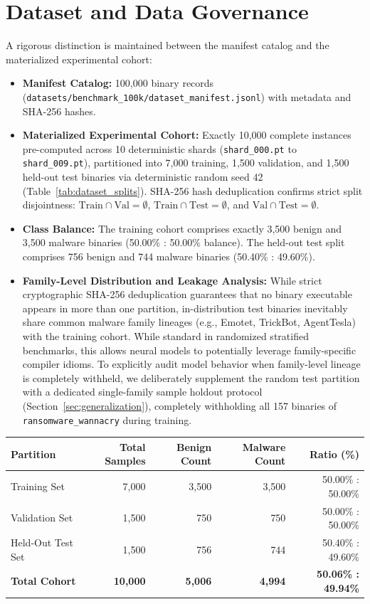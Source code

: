 \documentclass[pdflatex,sn-mathphys-num]{sn-jnl}
\begin{document}
\section{Dataset and Data Governance}\label{sec:dataset}
A rigorous distinction is maintained between the manifest catalog and the materialized experimental cohort:
\begin{itemize}
    \item \textbf{Manifest Catalog:} 100,000 binary records (\texttt{datasets/benchmark\_100k/dataset\_manifest.jsonl}) with metadata and SHA-256 hashes.
    \item \textbf{Materialized Experimental Cohort:} Exactly 10,000 complete instances pre-computed across 10 deterministic shards (\texttt{shard\_000.pt} to \texttt{shard\_009.pt}), partitioned into 7,000 training, 1,500 validation, and 1,500 held-out test binaries via deterministic random seed 42 (Table~\ref{tab:dataset_splits}). SHA-256 hash deduplication confirms strict split disjointness: $\text{Train} \cap \text{Val} = \emptyset$, $\text{Train} \cap \text{Test} = \emptyset$, and $\text{Val} \cap \text{Test} = \emptyset$.
    \item \textbf{Class Balance:} The training cohort comprises exactly 3,500 benign and 3,500 malware binaries (50.00\% : 50.00\% balance). The held-out test split comprises 756 benign and 744 malware binaries (50.40\% : 49.60\%).
    \item \textbf{Family-Level Distribution and Leakage Analysis:} While strict cryptographic SHA-256 deduplication guarantees that no binary executable appears in more than one partition, in-distribution test binaries inevitably share common malware family lineages (e.g., Emotet, TrickBot, AgentTesla) with the training cohort. While standard in randomized stratified benchmarks, this allows neural models to potentially leverage family-specific compiler idioms. To explicitly audit model behavior when family-level lineage is completely withheld, we deliberately supplement the random test partition with a dedicated single-family sample holdout protocol (Section~\ref{sec:generalization}), completely withholding all 157 binaries of \texttt{ransomware\_wannacry} during training.
\end{itemize}

\begin{tableorg}[t]
\centering
\caption{Materialized multimodal experimental dataset partitions.}\label{tab:dataset_splits}
\begin{tabular}{lrrrr}
\toprule
Partition & Total Samples & Benign Count & Malware Count & Ratio (\%) \\
\midrule
Training Set & 7,000 & 3,500 & 3,500 & 50.00\% : 50.00\% \\
Validation Set & 1,500 & 750 & 750 & 50.00\% : 50.00\% \\
Held-Out Test Set & 1,500 & 756 & 744 & 50.40\% : 49.60\% \\
\midrule
\textbf{Total Cohort} & \textbf{10,000} & \textbf{5,006} & \textbf{4,994} & \textbf{50.06\% : 49.94\%} \\
\bottomrule
\end{tabular}
\end{tableorg}
\end{document}

